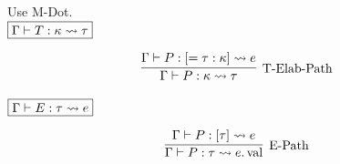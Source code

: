 Use M-Dot. \\

$\fbox{$\Gamma \vdash T: \kappa \rightsquigarrow \tau$}$

\begin{gather*}
  \infer[\text{T-Elab-Path}]{\Gamma \vdash P: \kappa \elaborate \tau}{
    \Gamma \vdash P: [= \tau: \kappa] \elaborate e
  }
\end{gather*}

$\fbox{$\Gamma \vdash E: \tau \rightsquigarrow e$}$

\begin{gather*}
  \infer[\text{E-Path}]{\Gamma \vdash P: \tau \elaborate e.\symval}{
    \Gamma \vdash P: [\tau] \elaborate e
  }
\end{gather*}

